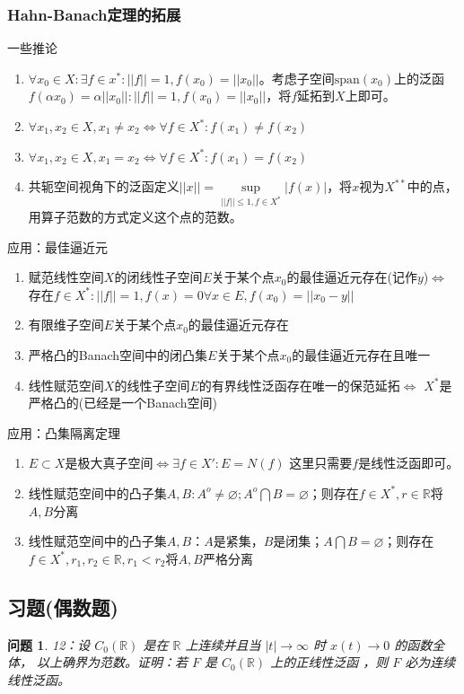 \documentclass[a4paper, 12pt]{ctexart}
\newtheorem*{theorem}{问题}%
\begin{document}
\subsubsection{Hahn-Banach定理的拓展}
一些推论
\begin{enumerate}
    \item $\forall x_0 \in X:\exists f \in x^*:||f||=1,f(x_0)=||x_0||$。考虑子空间$\text{span}(x_0)$上的泛函$f(\alpha x_0)=\alpha ||x_0||:||f||=1,f(x_0)=||x_0||$，将$f$延拓到$X$上即可。
    \item $\forall x_1,x_2 \in X, x_1 \neq x_2 \iff \forall f \in X^*:f(x_1)\neq f(x_2)$
    \item $\forall x_1,x_2 \in X, x_1 = x_2 \iff \forall f \in X^*:f(x_1) = f(x_2)$
    \item 共轭空间视角下的泛函定义$||x||=\underset{||f||\leq 1,f \in X^*}{\sup} |f(x)|$，将$x$视为$X^{**}$中的点，用算子范数的方式定义这个点的范数。
\end{enumerate}

应用：最佳逼近元
\begin{enumerate}
    \item 赋范线性空间$X$的闭线性子空间$E$关于某个点$x_0$的最佳逼近元存在(记作$y$)$\iff$存在$f \in X^*:||f||=1,f(x)=0\forall x\in E,f(x_0)=||x_0-y||$
    \item 有限维子空间$E$关于某个点$x_0$的最佳逼近元存在
    \item 严格凸的Banach空间中的闭凸集$E$关于某个点$x_0$的最佳逼近元存在且唯一
    \item 线性赋范空间$X$的线性子空间$E$的有界线性泛函存在唯一的保范延拓$\iff$ $X^*$是严格凸的(已经是一个Banach空间)
\end{enumerate}

应用：凸集隔离定理
\begin{enumerate}
    \item $E\subset X$是极大真子空间$\iff$$\exists f \in X':E=N(f)$ 这里只需要$f$是线性泛函即可。
    \item 线性赋范空间中的凸子集$A,B:A^o\neq \varnothing;A^o \bigcap B = \varnothing$；则存在$f \in X^*,r \in \mathbb{R}$将$A,B$分离
    \item 线性赋范空间中的凸子集$A,B$：$A$是紧集，$B$是闭集；$A \bigcap B =\varnothing$；则存在$f \in X^*,r_1,r_2 \in \mathbb{R},r_1<r_2$将$A,B$严格分离
\end{enumerate}

\subsection{习题(偶数题)}
\begin{theorem}
12：设 $C_{0}(\mathbb{R})$ 是在 $\mathbb{R}$ 上连续并且当
$|t| \rightarrow \infty$ 时 $x(t) \rightarrow 0$ 的函数全体，
以上确界为范数。证明：若 $F$ 是 $C_{0}(\mathbb{R})$ 上的正线性泛函
，则 $F$ 必为连续线性泛函。
\end{theorem}
 
\end{document}
